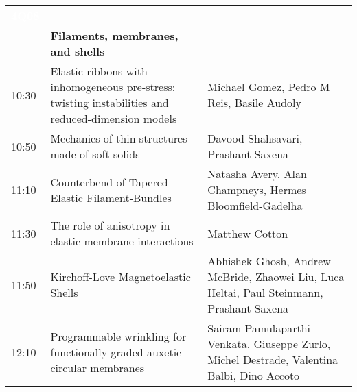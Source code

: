 \begin{tabularx}{\linewidth}{C{15mm}YP{50mm}}
\textcolor{white}{\textbf{4Q08}} & & \\
& \textbf{Filaments, membranes, and shells} & \\
10:30 & Elastic ribbons with inhomogeneous pre-stress: twisting instabilities and reduced-dimension models & Michael Gomez, Pedro M Reis, Basile Audoly\\
10:50 & Mechanics of thin structures made of soft solids & Davood Shahsavari, Prashant Saxena\\
11:10 & Counterbend of Tapered Elastic Filament-Bundles & Natasha Avery, Alan Champneys, Hermes Bloomfield-Gadelha\\
11:30 & The role of anisotropy in elastic membrane interactions & Matthew Cotton\\
11:50 & Kirchoff-Love Magnetoelastic Shells & Abhishek Ghosh, Andrew McBride, Zhaowei Liu, Luca Heltai, Paul Steinmann, Prashant Saxena\\
12:10 & Programmable wrinkling for functionally-graded auxetic circular membranes & Sairam Pamulaparthi Venkata, Giuseppe Zurlo, Michel Destrade, Valentina Balbi, Dino Accoto\\
\end{tabularx}

